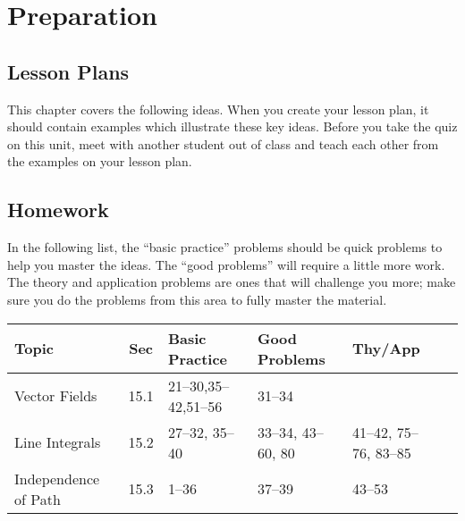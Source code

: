 \section{Preparation}

\subsection{Lesson Plans}

This chapter covers the following ideas. When you create your lesson plan, it should contain examples which illustrate these key ideas. Before you take the quiz on this unit, meet with another student out of class and teach each other from the examples on your lesson plan. 





\subsection{Homework}

In the following list, the ``basic practice'' problems should be quick
problems to help you master the ideas.  The ``good problems'' will
require a little more work.  The theory and application problems are
ones that will challenge you more; make sure you do the problems from
this area to fully master the material.  

{\noindent %
\begin{tabular}{|l|c|l|l|l|l|}\hline
Topic &Sec &Basic Practice &Good Problems &Thy/App \\\hline
Vector Fields & 15.1&21--30,35--42,51--56 & 31--34& \\\hline
Line Integrals & 15.2&27--32, 35--40 & 33--34, 43--60, 80 & 41--42, 75--76, 83--85\\\hline
Independence of Path & 15.3&1--36 & 37--39& 43--53\\\hline
\end{tabular}

}




